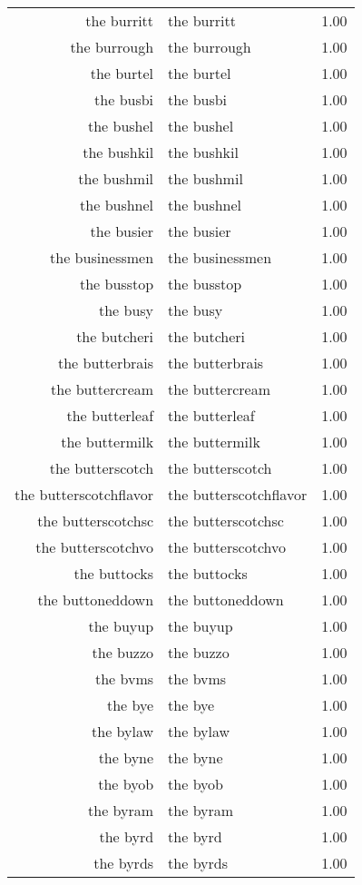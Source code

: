 \begin{table}[ht]
\begin{tabular}{rlr}
  the burritt & the burritt & 1.00 \\ 
  the burrough & the burrough & 1.00 \\ 
  the burtel & the burtel & 1.00 \\ 
  the busbi & the busbi & 1.00 \\ 
  the bushel & the bushel & 1.00 \\ 
  the bushkil & the bushkil & 1.00 \\ 
  the bushmil & the bushmil & 1.00 \\ 
  the bushnel & the bushnel & 1.00 \\ 
  the busier & the busier & 1.00 \\ 
  the businessmen & the businessmen & 1.00 \\ 
  the busstop & the busstop & 1.00 \\ 
  the busy & the busy & 1.00 \\ 
  the butcheri & the butcheri & 1.00 \\ 
  the butterbrais & the butterbrais & 1.00 \\ 
  the buttercream & the buttercream & 1.00 \\ 
  the butterleaf & the butterleaf & 1.00 \\ 
  the buttermilk & the buttermilk & 1.00 \\ 
  the butterscotch & the butterscotch & 1.00 \\ 
  the butterscotchflavor & the butterscotchflavor & 1.00 \\ 
  the butterscotchsc & the butterscotchsc & 1.00 \\ 
  the butterscotchvo & the butterscotchvo & 1.00 \\ 
  the buttocks & the buttocks & 1.00 \\ 
  the buttoneddown & the buttoneddown & 1.00 \\ 
  the buyup & the buyup & 1.00 \\ 
  the buzzo & the buzzo & 1.00 \\ 
  the bvms & the bvms & 1.00 \\ 
  the bye & the bye & 1.00 \\ 
  the bylaw & the bylaw & 1.00 \\ 
  the byne & the byne & 1.00 \\ 
  the byob & the byob & 1.00 \\ 
  the byram & the byram & 1.00 \\ 
  the byrd & the byrd & 1.00 \\ 
  the byrds & the byrds & 1.00 \\ 

\end{tabular}
\end{table}
